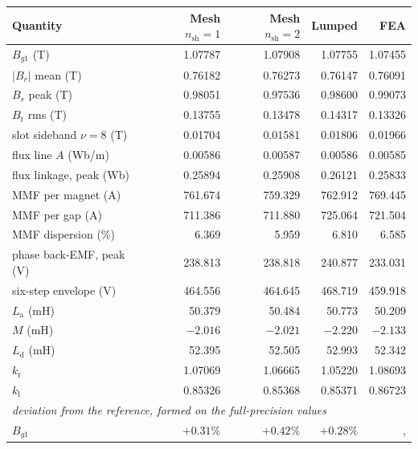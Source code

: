 \documentclass[10pt,a4paper,twocolumn]{article}
\theoremstyle{plain}
\theoremstyle{remark}
\begin{document}
\begin{table}[!t]
\centering
\begin{threeparttable}
\footnotesize
\begin{tabular}{@{}lrrrr@{}}
\toprule
Quantity & Mesh $n_{\mathrm{sh}}{=}1$ & Mesh $n_{\mathrm{sh}}{=}2$
& Lumped & FEA\\
\midrule
$B_{g1}$ (T)                          & 1.07787 & 1.07908 & 1.07755 & 1.07455\\
$|B_r|$ mean (T)                      & 0.76182 & 0.76273 & 0.76147 & 0.76091\\
$B_r$ peak (T)                        & 0.98051 & 0.97536 & 0.98600 & 0.99073\\
$B_t$ rms (T)                         & 0.13755 & 0.13478 & 0.14317 & 0.13326\\
slot sideband $\nu=8$ (T)             & 0.01704 & 0.01581 & 0.01806 & 0.01966\\
flux line $A$ (Wb/m)                  & 0.00586 & 0.00587 & 0.00586 & 0.00585\\
flux linkage, peak (Wb)               & 0.25894 & 0.25908 & 0.26121 & 0.25833\\
MMF per magnet (A)                    & 761.674 & 759.329 & 762.912 & 769.445\\
MMF per gap (A)                       & 711.386 & 711.880 & 725.064 & 721.504\\
MMF dispersion (\%)                   & 6.369   & 5.959   & 6.810   & 6.585\\
phase back-EMF, peak (V)              & 238.813 & 238.818 & 240.877 & 233.031\\
six-step envelope (V)                 & 464.556 & 464.645 & 468.719 & 459.918\\
$L_{\mathrm{a}}$ (mH)                 & 50.379  & 50.484  & 50.773  & 50.209\\
$M$ (mH)                              & $-2.016$& $-2.021$& $-2.220$& $-2.133$\\
$L_{\mathrm{d}}$ (mH)                 & 52.395  & 52.505  & 52.993  & 52.342\\
$k_{\mathrm{r}}$                      & 1.07069 & 1.06665 & 1.05220 & 1.08693\\
$k_{\mathrm{l}}$                      & 0.85326 & 0.85368 & 0.85371 & 0.86723\\
\midrule
\multicolumn{5}{l}{\emph{deviation from the reference, formed on the full-precision values}}\\
$B_{g1}$                              & $+0.31\%$ & $+0.42\%$ & $+0.28\%$ &, \\

\end{tabular}
\end{threeparttable}
\end{table}
\end{document}
